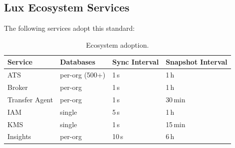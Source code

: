 \subsection{Lux Ecosystem Services}

The following services adopt this standard:

\begin{table}[H]
\centering
\caption{Ecosystem adoption.}
\label{tab:adoption}
\begin{tabular}{@{}llll@{}}
\toprule
\textbf{Service} & \textbf{Databases} & \textbf{Sync Interval} &
  \textbf{Snapshot Interval} \\
\midrule
ATS & per-org (500+) & 1\,s & 1\,h \\
Broker & per-org & 1\,s & 1\,h \\
Transfer Agent & per-org & 1\,s & 30\,min \\
IAM & single & 5\,s & 1\,h \\
KMS & single & 1\,s & 15\,min \\
Insights & per-org & 10\,s & 6\,h \\
\bottomrule
\end{tabular}
\end{table}

